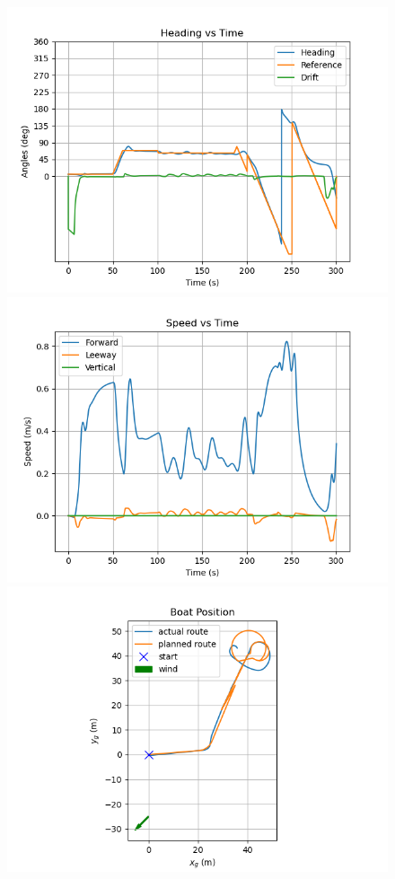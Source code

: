 \documentclass[conference]{IEEEtran}
\begin{document}
\begin{figure}
     \centering
     \includegraphics[trim={0.5cm 0.25cm 1.25cm 0.75cm},clip]{documents/final_pres_figs/against_wind_to_40_40_heading.png}
     
     \includegraphics[trim={0.5cm 0.25cm 1.25cm 0.75cm },clip]{documents/final_pres_figs/against_wind_to_40_40_speed.png}
     
     \includegraphics[trim={0.5cm 0.0cm 1.25cm 0.5cm },clip]{documents/final_pres_figs/against_wind_to_40_40_pos.png}
     

\end{figure}
\end{document}
